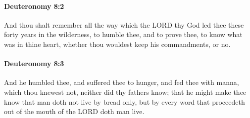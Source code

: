 		\paragraph{Deuteronomy 8:2} %
			\label{DEUTERONOMY-8-2}

			And thou shalt remember all the way which the LORD thy God led thee these forty years in the wilderness, to humble thee, and to prove thee, to know what was in thine heart, whether thou wouldest keep his commandments, or no.


		\paragraph{Deuteronomy 8:3} %
			\label{DEUTERONOMY-8-3}

			And he humbled thee, and suffered thee to hunger, and fed thee with manna, which thou knewest not, neither did thy fathers know; that he might make thee know that man doth not live by bread only, but by every word that proceedeth out of the mouth of the LORD doth man live.

